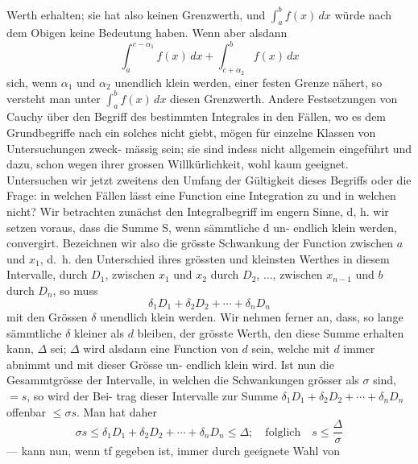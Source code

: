 \documentclass[12pt,a4paper]{book}
\theoremstyle{definition}
\theoremstyle{remark}
\begin{document}
{{%
Werth  erhalten;  sie  hat  also  keinen  Grenzwerth,  und  $\int_a^b f(x)\, dx$  würde
nach  dem  Obigen  keine  Bedeutung  haben.  Wenn  aber  alsdann
\[ \int_a^{c-\alpha_1} f(x)\, dx + \int_{c+\alpha_2}^b f(x)\, dx \]
sich,  wenn  $\alpha_1$  und  $\alpha_2$  unendlich  klein  werden,  einer  festen  Grenze
nähert,  so  versteht  man  unter  $\int_a^b f(x)\, dx$  diesen  Grenzwerth.
Andere  Festsetzungen  von  Cauchy  über  den  Begriff  des  bestimmten
Integrales  in  den  Fällen,  wo  es  dem  Grundbegriffe  nach  ein  solches
nicht  giebt,  mögen  für  einzelne  Klassen  von  Untersuchungen  zweck-
mässig sein;  sie  sind  indess  nicht  allgemein  eingeführt  und  dazu,  schon
wegen  ihrer  grossen  Willkürlichkeit,  wohl  kaum  geeignet.
Untersuchen  wir  jetzt  zweitens  den  Umfang  der  Gültigkeit  dieses
Begriffs  oder  die  Frage:  in  welchen  Fällen  lässt  eine  Function  eine
Integration  zu  und  in  welchen  nicht?
Wir  betrachten  zunächst  den  Integralbegriff  im  engern  Sinne,
d,  h.  wir  setzen  voraus,  dass  die  Summe  S,  wenn  sämmtliche  d  un-
endlich klein  werden,  convergirt.  Bezeichnen  wir  also  die  grösste
Schwankung  der  Function  zwischen  $a$  und  $x_1$,  d.~h.  den  Unterschied
ihres  grössten  und  kleinsten  Werthes  in  diesem  Intervalle,  durch  $D_1$,
zwischen  $x_1$  und  $x_2$  durch  $D_2$,  $\ldots$,  zwischen  $x_{n-1}$  und  $b$  durch  $D_n$,
so  muss
\[ \delta_1 D_1 + \delta_2 D_2 + \cdots + \delta_n D_n \]
mit  den  Grössen  $\delta$  unendlich  klein  werden.  Wir  nehmen  ferner  an,
dass,  so  lange  sämmtliche  $\delta$  kleiner  als  $d$  bleiben,  der  grösste  Werth,
den  diese  Summe  erhalten  kann,  $\Delta$  sei;  $\Delta$  wird  alsdann  eine  Function
von  $d$  sein,  welche  mit  $d$  immer  abnimmt  und  mit  dieser  Grösse  un-
endlich  klein  wird.  Ist  nun  die  Gesammtgrösse  der  Intervalle,  in
welchen  die  Schwankungen  grösser  als  $\sigma$  sind,  $= s$,  so  wird  der  Bei-
trag  dieser  Intervalle  zur  Summe  $\delta_1 D_1 + \delta_2 D_2 + \cdots + \delta_n D_n$  offenbar
$\leq \sigma s$.  Man  hat  daher
\[ \sigma s \leq \delta_1 D_1 + \delta_2 D_2 + \cdots + \delta_n D_n \leq \Delta; \quad \text{folglich} \quad s \leq \frac{\Delta}{\sigma} \]
---  kann  nun,  wenn  tf  gegeben  ist,  immer  durch  geeignete  Wahl  von
\newpage

}}
\end{document}
